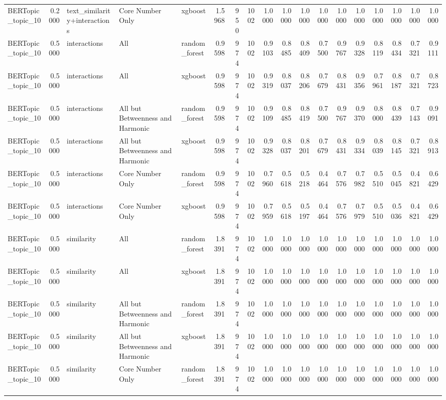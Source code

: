 \begin{tabular}{lrlllrrrrrrrrrrrrr}
BERTopic_topic_10 & 0.2000 & text_similarity+interactions & Core Number Only & xgboost & 1.5968 & 950 & 1002 & 1.0000 & 1.0000 & 1.0000 & 1.0000 & 1.0000 & 1.0000 & 1.0000 & 1.0000 & 1.0000 & 1.0000 \\
BERTopic_topic_10 & 0.5000 & interactions & All & random_forest & 0.9598 & 974 & 1002 & 0.9103 & 0.8485 & 0.8409 & 0.7500 & 0.9767 & 0.9328 & 0.8119 & 0.8434 & 0.7321 & 0.9111 \\
BERTopic_topic_10 & 0.5000 & interactions & All & xgboost & 0.9598 & 974 & 1002 & 0.9319 & 0.8037 & 0.8206 & 0.7679 & 0.8431 & 0.9356 & 0.7961 & 0.8187 & 0.7321 & 0.8723 \\
BERTopic_topic_10 & 0.5000 & interactions & All but Betweenness and Harmonic & random_forest & 0.9598 & 974 & 1002 & 0.9109 & 0.8485 & 0.8419 & 0.7500 & 0.9767 & 0.9370 & 0.8000 & 0.8439 & 0.7143 & 0.9091 \\
BERTopic_topic_10 & 0.5000 & interactions & All but Betweenness and Harmonic & xgboost & 0.9598 & 974 & 1002 & 0.9328 & 0.8037 & 0.8201 & 0.7679 & 0.8431 & 0.9334 & 0.8039 & 0.8145 & 0.7321 & 0.8913 \\
BERTopic_topic_10 & 0.5000 & interactions & Core Number Only & random_forest & 0.9598 & 974 & 1002 & 0.7960 & 0.5618 & 0.5218 & 0.4464 & 0.7576 & 0.7982 & 0.5510 & 0.5045 & 0.4821 & 0.6429 \\
BERTopic_topic_10 & 0.5000 & interactions & Core Number Only & xgboost & 0.9598 & 974 & 1002 & 0.7959 & 0.5618 & 0.5197 & 0.4464 & 0.7576 & 0.7979 & 0.5510 & 0.5036 & 0.4821 & 0.6429 \\
BERTopic_topic_10 & 0.5000 & similarity & All & random_forest & 1.8391 & 974 & 1002 & 1.0000 & 1.0000 & 1.0000 & 1.0000 & 1.0000 & 1.0000 & 1.0000 & 1.0000 & 1.0000 & 1.0000 \\
BERTopic_topic_10 & 0.5000 & similarity & All & xgboost & 1.8391 & 974 & 1002 & 1.0000 & 1.0000 & 1.0000 & 1.0000 & 1.0000 & 1.0000 & 1.0000 & 1.0000 & 1.0000 & 1.0000 \\
BERTopic_topic_10 & 0.5000 & similarity & All but Betweenness and Harmonic & random_forest & 1.8391 & 974 & 1002 & 1.0000 & 1.0000 & 1.0000 & 1.0000 & 1.0000 & 1.0000 & 1.0000 & 1.0000 & 1.0000 & 1.0000 \\
BERTopic_topic_10 & 0.5000 & similarity & All but Betweenness and Harmonic & xgboost & 1.8391 & 974 & 1002 & 1.0000 & 1.0000 & 1.0000 & 1.0000 & 1.0000 & 1.0000 & 1.0000 & 1.0000 & 1.0000 & 1.0000 \\
BERTopic_topic_10 & 0.5000 & similarity & Core Number Only & random_forest & 1.8391 & 974 & 1002 & 1.0000 & 1.0000 & 1.0000 & 1.0000 & 1.0000 & 1.0000 & 1.0000 & 1.0000 & 1.0000 & 1.0000 \\

\end{tabular}
